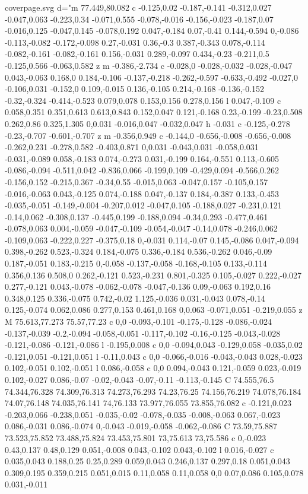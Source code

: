 \begin{filecontents}[noheader]{coverpage.svg}
					 d="m 77.449,80.082 c -0.125,0.02 -0.187,-0.141 -0.312,0.027 -0.047,0.063 -0.223,0.34 -0.071,0.555 -0.078,-0.016 -0.156,-0.023 -0.187,0.07 -0.016,0.125 -0.047,0.145 -0.078,0.192 0.047,-0.184 0.07,-0.41 0.144,-0.594 0,-0.086 -0.113,-0.082 -0.172,-0.098 0.27,-0.031 0.36,-0.3 0.387,-0.343 0.078,-0.114 -0.082,-0.161 -0.082,-0.161 0.156,-0.031 0.289,-0.097 0.434,-0.23 -0.211,0.5 -0.125,0.566 -0.063,0.582 z m -0.386,-2.734 c -0.028,0 -0.028,-0.032 -0.028,-0.047 0.043,-0.063 0.168,0 0.184,-0.106 -0.137,-0.218 -0.262,-0.597 -0.633,-0.492 -0.027,0 -0.106,0.031 -0.152,0 0.109,-0.015 0.136,-0.105 0.214,-0.168 -0.136,-0.152 -0.32,-0.324 -0.414,-0.523 0.079,0.078 0.153,0.156 0.278,0.156 l 0.047,-0.109 c 0.058,0.351 0.351,0.613 0.613,0.843 0.152,0.047 0.121,-0.168 0.23,-0.199 -0.23,0.508 0.262,0.86 0.325,1.305 0,0.031 -0.016,0.047 -0.032,0.047 h -0.031 c -0.125,-0.278 -0.23,-0.707 -0.601,-0.707 z m -0.356,0.949 c -0.144,0 -0.656,-0.008 -0.656,-0.008 -0.262,0.231 -0.278,0.582 -0.403,0.871 0,0.031 -0.043,0.031 -0.058,0.031 -0.031,-0.089 0.058,-0.183 0.074,-0.273 0.031,-0.199 0.164,-0.551 0.113,-0.605 -0.086,-0.094 -0.511,0.042 -0.836,0.066 -0.199,0.109 -0.429,0.094 -0.566,0.262 -0.156,0.152 -0.215,0.367 -0.34,0.55 -0.015,0.063 -0.047,0.157 -0.105,0.157 -0.016,-0.063 0.043,-0.125 0.074,-0.188 0.047,-0.137 0.184,-0.387 0.133,-0.453 -0.035,-0.051 -0.149,-0.004 -0.207,0.012 -0.047,0.105 -0.188,0.027 -0.231,0.121 -0.14,0.062 -0.308,0.137 -0.445,0.199 -0.188,0.094 -0.34,0.293 -0.477,0.461 -0.078,0.063 0.004,-0.059 -0.047,-0.109 -0.054,-0.047 -0.14,0.078 -0.246,0.062 -0.109,0.063 -0.222,0.227 -0.375,0.18 0,-0.031 0.114,-0.07 0.145,-0.086 0.047,-0.094 0.398,-0.262 0.523,-0.324 0.184,-0.075 0.336,-0.184 0.536,-0.262 0.046,-0.09 0.187,-0.051 0.183,-0.215 0,-0.058 -0.137,-0.058 -0.168,-0.105 0.133,-0.114 0.356,0.136 0.508,0 0.262,-0.121 0.523,-0.231 0.801,-0.325 0.105,-0.027 0.222,-0.027 0.277,-0.121 0.043,-0.078 -0.062,-0.078 -0.047,-0.136 0.09,-0.063 0.192,0.16 0.348,0.125 0.336,-0.075 0.742,-0.02 1.125,-0.036 0.031,-0.043 0.078,-0.14 0.125,-0.074 0.062,0.086 0.277,0.153 0.461,0.168 0,0.063 -0.071,0.051 -0.219,0.055 z M 75.613,77.273 75.57,77.23 c 0,0 -0.093,-0.101 -0.175,-0.128 -0.086,-0.024 -0.137,-0.039 -0.2,-0.094 -0.058,-0.051 -0.117,-0.102 -0.16,-0.125 -0.043,-0.028 -0.121,-0.086 -0.121,-0.086 l -0.195,0.008 c 0,0 -0.094,0.043 -0.129,0.058 -0.035,0.02 -0.121,0.051 -0.121,0.051 l -0.11,0.043 c 0,0 -0.066,-0.016 -0.043,-0.043 0.028,-0.023 0.102,-0.051 0.102,-0.051 l 0.086,-0.058 c 0,0 0.094,-0.043 0.121,-0.059 0.023,-0.019 0.102,-0.027 0.086,-0.07 -0.02,-0.043 -0.07,-0.11 -0.113,-0.145 C 74.555,76.5 74.344,76.328 74.309,76.313 74.273,76.293 74.23,76.25 74.156,76.219 74.078,76.184 74.07,76.148 74.035,76.141 74,76.133 73.977,76.055 73.855,76.082 c -0.121,0.023 -0.203,0.066 -0.238,0.051 -0.035,-0.02 -0.078,-0.035 -0.008,-0.063 0.067,-0.023 0.086,-0.031 0.086,-0.074 0,-0.043 -0.019,-0.058 -0.062,-0.086 C 73.59,75.887 73.523,75.852 73.488,75.824 73.453,75.801 73,75.613 73,75.586 c 0,-0.023 0.43,0.137 0.48,0.129 0.051,-0.008 0.043,-0.102 0.043,-0.102 l 0.016,-0.027 c 0.035,0.043 0.188,0.25 0.25,0.289 0.059,0.043 0.246,0.137 0.297,0.18 0.051,0.043 0.309,0.195 0.359,0.215 0.051,0.015 0.11,0.058 0.11,0.058 0,0 0.07,0.086 0.105,0.078 0.031,-0.011 
\end{filecontents}
